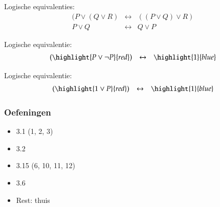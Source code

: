 \documentclass[dutch]{../khlslides}
\newcommand{\OR}{\vee}
\newcommand{\IFF}{\leftrightarrow}
\newcommand{\NOT}{\neg}
\begin{document}
{\begin{frame}
\begin{overprint}
      Logische equivalenties:
      \[
        \begin{array}{rcl}
          (P \OR (Q \OR R) & \IFF & ((P \OR Q) \OR R) \\
          P \OR Q & \IFF & Q \OR P
        \end{array}
      \]

      Logische equivalentie:
      \[
        \begin{array}{rcl}
          (\highlight{P \OR \NOT P}{red}) & \IFF & \highlight{1}{blue}
        \end{array}
      \]

      Logische equivalentie:
      \[
        \begin{array}{rcl}
          (\highlight{1 \OR P}{red}) & \IFF & \highlight{1}{blue}
        \end{array}
      \]
    \end{overprint}
  \end{frame}
}

\begin{frame}
  \frametitle{Oefeningen}
  \begin{itemize}
    \item 3.1 (1, 2, 3)
    \item 3.2
    \item 3.15 (6, 10, 11, 12)
    \item 3.6
    \item Rest: thuis
  \end{itemize}
\end{frame}
\end{document}
